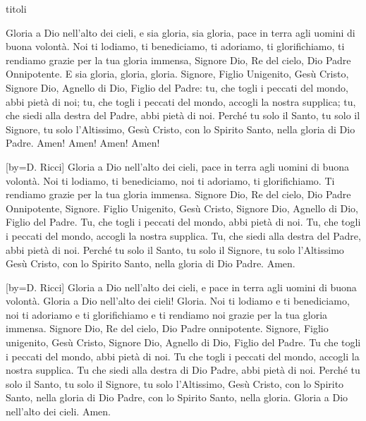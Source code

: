\begin{songs}{titoli}

\beginverse
Gloria a Dio nell'alto dei cieli,
e sia gloria, sia gloria,
pace in terra agli uomini di buona volontà.
\endverse
\beginverse
Noi ti lodiamo, ti benediciamo,
ti adoriamo, ti glorifichiamo,
ti rendiamo grazie per la tua gloria immensa,
Signore Dio, Re del cielo, Dio Padre Onnipotente.
\endverse
\beginchorus
E sia gloria, gloria, gloria.
\endchorus
\beginverse
Signore, Figlio Unigenito,
Gesù Cristo, Signore Dio,
Agnello di Dio, Figlio del Padre:
tu, che togli i peccati del mondo, abbi pietà di noi;
tu, che togli i peccati del mondo, accogli la nostra supplica;
tu, che siedi alla destra del Padre, abbi pietà di noi.
\endverse
\beginverse
Perché tu solo il Santo,
tu solo il Signore,
tu solo l'Altissimo, Gesù Cristo,
con lo Spirito Santo, nella gloria di Dio Padre. Amen!
\endverse
\beginverse*
Amen! Amen! Amen!
\endverse
\endsong

[by={D. Ricci}]
\beginverse*
Gloria a Dio nell'alto dei cieli,
pace in terra agli uomini di buona volontà.
Noi ti lodiamo, ti benediciamo,
noi ti adoriamo, ti glorifichiamo.
Ti rendiamo grazie per la tua gloria immensa.
Signore Dio, Re del cielo,
Dio Padre Onnipotente, Signore.
Figlio Unigenito, Gesù Cristo, Signore Dio,
Agnello di Dio, Figlio del Padre.
Tu, che togli i peccati del mondo,
abbi pietà di noi.
Tu, che togli i peccati del mondo,
accogli la nostra supplica.
Tu, che siedi alla destra del Padre,
abbi pietà di noi.
Perché tu solo il Santo, tu solo il Signore,
tu solo l'Altissimo Gesù Cristo,
con lo Spirito Santo, nella gloria di Dio Padre.
Amen.
\endverse
\endsong

[by={D. Ricci}]
\beginchorus
Gloria a Dio nell'alto dei cieli,
e pace in terra agli uomini di buona volontà.
Gloria a Dio nell'alto dei cieli!
Gloria. 
\endchorus
\beginverse
Noi ti lodiamo e ti benediciamo,
noi ti adoriamo e ti glorifichiamo
e ti rendiamo noi grazie per la tua gloria immensa.
Signore Dio, Re del cielo, Dio Padre onnipotente.
\endverse
\beginverse
Signore, Figlio unigenito, Gesù Cristo,
Signore Dio, Agnello di Dio, Figlio del Padre.
Tu che togli i peccati del mondo, abbi pietà di noi.
Tu che togli i peccati del mondo, accogli la nostra supplica.
Tu che siedi alla destra di Dio Padre, abbi pietà di noi.
\endverse
\beginverse
Perché tu solo il Santo, tu solo il Signore,
tu solo l'Altissimo, Gesù Cristo,
con lo Spirito Santo, nella gloria di Dio Padre,
con lo Spirito Santo, nella gloria.
\endverse
\beginverse*
Gloria a Dio nell'alto dei cieli.
Amen.
\endverse
\endsong


\end{songs}
